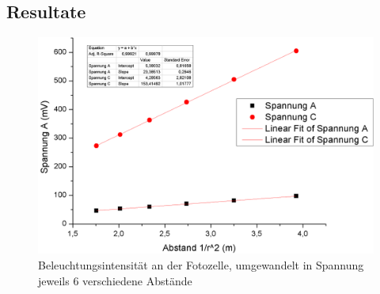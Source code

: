 \documentclass[12pt,a4paper]{article}
\begin{document}
\subsection{Resultate}


\begin{figure}[H]
	\centering
	\includegraphics[scale=0.6
	]{data/waermestrahlung.png}
	\caption{Beleuchtungsintensität an der Fotozelle, umgewandelt in Spannung\\
	jeweils 6 verschiedene Abstände}
	\label{fig:waermestrahlung_messung}
\end{figure}
\end{document}
